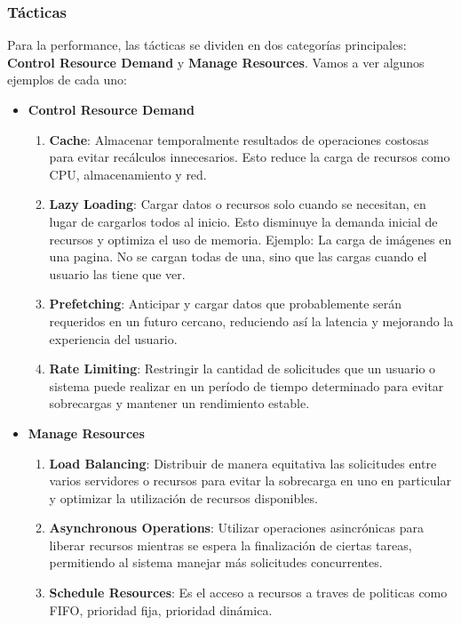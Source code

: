 \documentclass{article}
\begin{document}
		\subsubsection{Tácticas}
		Para la performance, las tácticas se dividen en dos categorías principales: \textbf{Control Resource Demand} y \textbf{Manage Resources}. Vamos a ver algunos ejemplos de cada uno:  
		
		\begin{itemize}		
			\item \textbf{Control Resource Demand}
			\begin{enumerate}
				\item \textbf{Cache}: Almacenar temporalmente resultados de operaciones costosas para evitar recálculos innecesarios. Esto reduce la carga de recursos como CPU, almacenamiento y red.
				
				\item \textbf{Lazy Loading}: Cargar datos o recursos solo cuando se necesitan, en lugar de cargarlos todos al inicio. Esto disminuye la demanda inicial de recursos y optimiza el uso de memoria. Ejemplo: La carga de imágenes en una pagina. No se cargan todas de una, sino que las cargas cuando el usuario las tiene que ver.
				
				\item \textbf{Prefetching}: Anticipar y cargar datos que probablemente serán requeridos en un futuro cercano, reduciendo así la latencia y mejorando la experiencia del usuario.
				
				
				\item \textbf{Rate Limiting}: Restringir la cantidad de solicitudes que un usuario o sistema puede realizar en un período de tiempo determinado para evitar sobrecargas y mantener un rendimiento estable.
				
				
			\end{enumerate}
			
			\item \textbf{Manage Resources}
			\begin{enumerate}
				\item \textbf{Load Balancing}: Distribuir de manera equitativa las solicitudes entre varios servidores o recursos para evitar la sobrecarga en uno en particular y optimizar la utilización de recursos disponibles.
				
				\item \textbf{Asynchronous Operations}: Utilizar operaciones asincrónicas para liberar recursos mientras se espera la finalización de ciertas tareas, permitiendo al sistema manejar más solicitudes concurrentes.
				
				\item \textbf{Schedule Resources}: Es el acceso a recursos a traves de politicas como FIFO, prioridad fija, prioridad dinámica.
				
				
			\end{enumerate}	
			
		\end{itemize}
		
\end{document}
